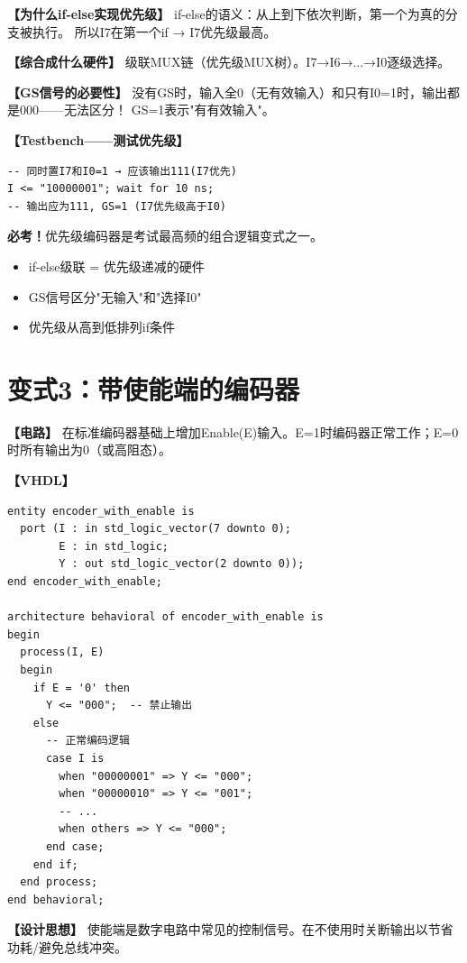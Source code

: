 \begin{detailbox}[完整教学]
\textbf{【为什么if-else实现优先级】}
if-else的语义：从上到下依次判断，第一个为真的分支被执行。
所以I7在第一个if → I7优先级最高。

\textbf{【综合成什么硬件】}
级联MUX链（优先级MUX树）。I7→I6→...→I0逐级选择。

\textbf{【GS信号的必要性】}
没有GS时，输入全0（无有效输入）和只有I0=1时，输出都是000——无法区分！
GS=1表示"有有效输入"。

\textbf{【Testbench——测试优先级】}
\begin{lstlisting}
-- 同时置I7和I0=1 → 应该输出111(I7优先)
I <= "10000001"; wait for 10 ns;
-- 输出应为111, GS=1 (I7优先级高于I0)
\end{lstlisting}

\begin{examfocus}
\textbf{必考！}优先级编码器是考试最高频的组合逻辑变式之一。
\begin{itemize}
  \item if-else级联 = 优先级递减的硬件
  \item GS信号区分"无输入"和"选择I0"
  \item 优先级从高到低排列if条件
\end{itemize}
\end{examfocus}

\end{detailbox}


\section{变式3：带使能端的编码器}

\begin{detailbox}[完整教学]

\textbf{【电路】}
在标准编码器基础上增加Enable(E)输入。E=1时编码器正常工作；E=0时所有输出为0（或高阻态）。

\textbf{【VHDL】}
\begin{lstlisting}
entity encoder_with_enable is
  port (I : in std_logic_vector(7 downto 0);
        E : in std_logic;
        Y : out std_logic_vector(2 downto 0));
end encoder_with_enable;

architecture behavioral of encoder_with_enable is
begin
  process(I, E)
  begin
    if E = '0' then
      Y <= "000";  -- 禁止输出
    else
      -- 正常编码逻辑
      case I is
        when "00000001" => Y <= "000";
        when "00000010" => Y <= "001";
        -- ...
        when others => Y <= "000";
      end case;
    end if;
  end process;
end behavioral;
\end{lstlisting}

\textbf{【设计思想】}
使能端是数字电路中常见的控制信号。在不使用时关断输出以节省功耗/避免总线冲突。

\end{detailbox}


